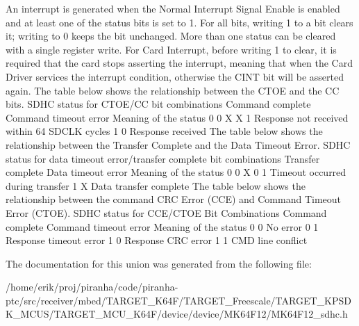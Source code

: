 An interrupt is generated when the Normal Interrupt Signal Enable is enabled and at least one of the status bits is set to 1. For all bits, writing 1 to a bit clears it; writing to 0 keeps the bit unchanged. More than one status can be cleared with a single register write. For Card Interrupt, before writing 1 to clear, it is required that the card stops asserting the interrupt, meaning that when the Card Driver services the interrupt condition, otherwise the C\+I\+NT bit will be asserted again. The table below shows the relationship between the C\+T\+OE and the CC bits. S\+D\+HC status for C\+T\+O\+E/\+CC bit combinations Command complete Command timeout error Meaning of the status 0 0 X X 1 Response not received within 64 S\+D\+C\+LK cycles 1 0 Response received The table below shows the relationship between the Transfer Complete and the Data Timeout Error. S\+D\+HC status for data timeout error/transfer complete bit combinations Transfer complete Data timeout error Meaning of the status 0 0 X 0 1 Timeout occurred during transfer 1 X Data transfer complete The table below shows the relationship between the command C\+RC Error (C\+CE) and Command Timeout Error (C\+T\+OE). S\+D\+HC status for C\+C\+E/\+C\+T\+OE Bit Combinations Command complete Command timeout error Meaning of the status 0 0 No error 0 1 Response timeout error 1 0 Response C\+RC error 1 1 C\+MD line conflict 

The documentation for this union was generated from the following file\+:\begin{DoxyCompactItemize}
\item 
/home/erik/proj/piranha/code/piranha-\/ptc/src/receiver/mbed/\+T\+A\+R\+G\+E\+T\+\_\+\+K64\+F/\+T\+A\+R\+G\+E\+T\+\_\+\+Freescale/\+T\+A\+R\+G\+E\+T\+\_\+\+K\+P\+S\+D\+K\+\_\+\+M\+C\+U\+S/\+T\+A\+R\+G\+E\+T\+\_\+\+M\+C\+U\+\_\+\+K64\+F/device/device/\+M\+K64\+F12/M\+K64\+F12\+\_\+sdhc.\+h\end{DoxyCompactItemize}
